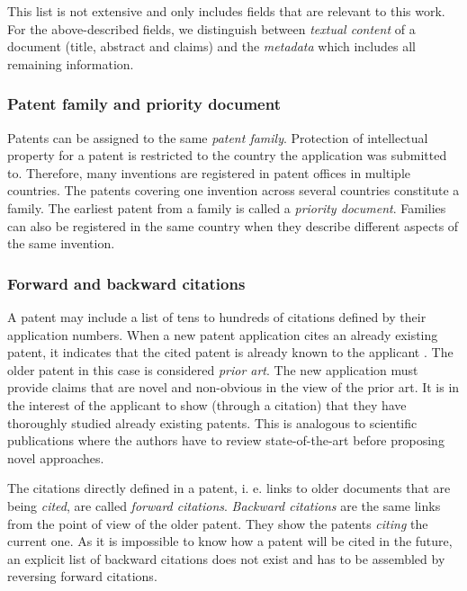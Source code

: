 This list is not extensive and only includes fields that are relevant to this work.
For the above-described fields, we distinguish between \textit{textual content} of a document (title, abstract and claims) and the \textit{metadata} which includes all remaining information.

\subsubsection{Patent family and priority document}
\label{subsubsec:patent_family_and_priority_document}

Patents can be assigned to the same \textit{patent family}.
Protection of intellectual property for a patent is restricted to the country the application was submitted to.
Therefore, many inventions are registered in patent offices in multiple countries.
The patents covering one invention across several countries constitute a family.
The earliest patent from a family is called a \textit{priority document}.
Families can also be registered in the same country when they describe different aspects of the same invention.

\subsubsection{Forward and backward citations}
\label{subsubsec:forward_backward_citations}

A patent may include a list of tens to hundreds of citations defined by their application numbers.
When a new patent application cites an already existing patent, it indicates that the cited patent is already known to the applicant \cite{Cotropia2013}.
The older patent in this case is considered \textit{prior art}. 
The new application must provide claims that are novel and non-obvious in the view of the prior art. 
It is in the interest of the applicant to show (through a citation) that they have thoroughly studied already existing patents.
This is analogous to scientific publications where the authors have to review state-of-the-art before proposing novel approaches.

The citations directly defined in a patent, i. e. links to older documents that are being \textit{cited}, are called \textit{forward citations}.
\textit{Backward citations} are the same links from the point of view of the older patent.
They show the patents \textit{citing} the current one.
As it is impossible to know how a patent will be cited in the future, an explicit list of backward citations does not exist and has to be assembled by reversing forward citations.

